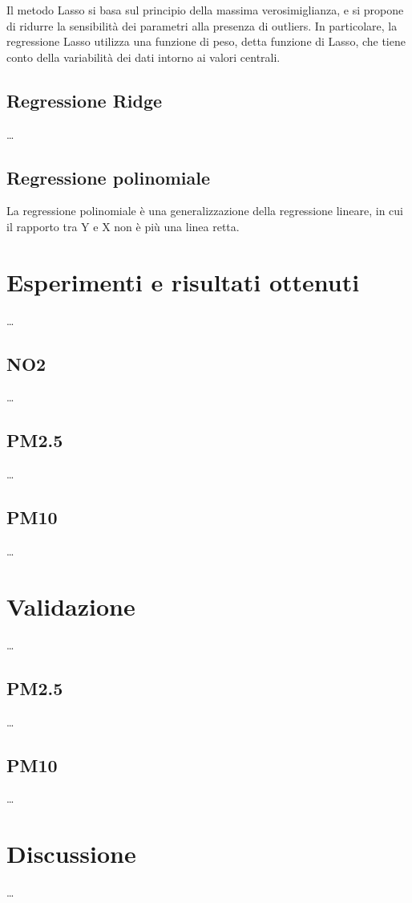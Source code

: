 Il metodo Lasso si basa sul principio della massima verosimiglianza, e si propone di ridurre la sensibilità dei parametri alla presenza di outliers. In particolare, la regressione Lasso utilizza una funzione di peso, detta funzione di Lasso, che tiene conto della variabilità dei dati intorno ai valori centrali.

\subsection{Regressione Ridge}\label{ssec:regressione-ridge}
\ldots

\subsection{Regressione polinomiale}\label{ssec:regressione-polinomiale}
La regressione polinomiale è una generalizzazione della regressione lineare, in cui il rapporto tra Y e X non è più una linea retta.

\section{Esperimenti e risultati ottenuti}\label{sec:esperimenti}
\ldots

\subsection{NO2}\label{ssec:risultati-no2}
\ldots

\subsection{PM2.5}\label{ssec:risultati-pm2.5}
\ldots

\subsection{PM10}\label{ssec:risultati-pm10}
\ldots

\section{Validazione}\label{sec:validazione}
\ldots

\subsection{PM2.5}\label{ssec:validazione-pm2.5}
\ldots

\subsection{PM10}\label{ssec:validazione-pm10}
\ldots

\section{Discussione}\label{sec:discussione}
\ldots